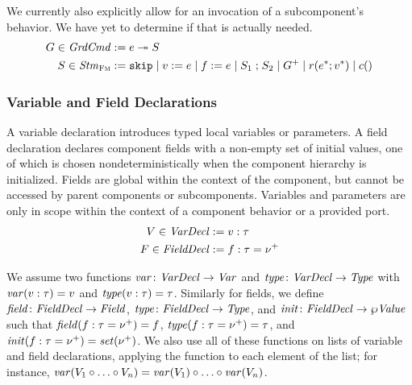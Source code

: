 \documentclass[a4paper,10pt,english]{article}
\begin{document}
We currently also explicitly allow for an invocation of a subcomponent's behavior. We have yet to determine if that is actually
needed.
\begin{align*}
	G \in \mathit{GrdCmd} &:= e \; \mathtt{\twoheadrightarrow} \; S \\
	S \in \mathit{Stm}_\textsc{Fm} &:=
		\mathtt{skip} \mid 
		v\; \mathtt{:=}\; e \mid
		f\; \mathtt{:=}\; e \mid
		S_1 \; \mathtt{;} \; S_2 \mid
		G^+ \mid
		r (e^*; v^*) \mid
		c ()
\end{align*}

\subsubsection{Variable and Field Declarations}
A variable declaration introduces typed local variables or parameters.
A field declaration declares component fields with a non-empty set of initial values, one of which is chosen
nondeterministically when the component hierarchy is initialized. Fields are global within the context of the component, but
cannot be accessed by parent components or subcomponents. Variables and parameters are only in scope within the context of a component behavior or
a provided port.
\begin{align*}
	V \in \mathit{VarDecl} &:= v \; \mathtt{:} \; \tau \\
	F \in \mathit{FieldDecl} &:= f \; \mathtt{:} \; \tau \; \mathtt{=} \; \nu^+
\end{align*}

We assume two functions $\mathit{var} \colon \mathit{VarDecl} \rightarrow \mathit{Var}$ and $\mathit{type} \colon \mathit{VarDecl} \rightarrow \mathit{Type}$ with
$\mathit{var}(v \; \mathtt{:} \; \tau) = v$ and $\mathit{type}(v \; \mathtt{:} \; \tau) = \tau$. Similarly for fields, we define
$\mathit{field} \colon \mathit{FieldDecl} \rightarrow \mathit{Field}$, $\mathit{type} \colon \mathit{FieldDecl} \rightarrow \mathit{Type}$, and $\mathit{init} \colon \mathit{FieldDecl} \rightarrow
\wp \mathit{Value}$ such that $\mathit{field}(f \; \mathtt{:} \; \tau \; \mathtt{=} \; \nu^+) = f$,
$\mathit{type}(f \; \mathtt{:} \; \tau \; \mathtt{=} \; \nu^+) = \tau$, and
$\mathit{init}(f \; \mathtt{:} \; \tau \; \mathtt{=} \; \nu^+) = \mathit{set}(\nu^+)$. We also use all of these functions
on lists of variable and field declarations, applying the function to each element of the list; for instance, $\mathit{var}(V_1
\circ \ldots \circ V_n) = \mathit{var}(V_1) \circ \ldots \circ \mathit{var}(V_n)$.
\end{document}
